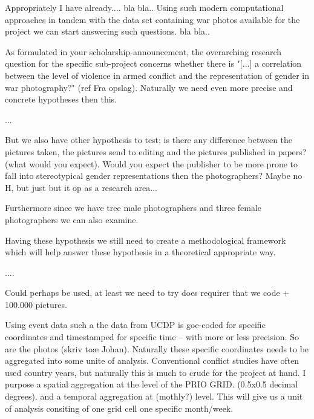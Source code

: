 \documentclass[a4paper]{article}
\begin{document}
Appropriately I have already.... bla bla.. Using such modern computational approaches in tandem with the data set containing war photos available for the project we can start answering such questions. bla bla.. \par

As formulated in your scholarship-announcement, the overarching research question for the specific sub-project concerns whether there is "[...] a correlation between the level of violence in armed conflict and the representation of gender in war photography?" (ref Fra opslag). Naturally we need even more precise and concrete hypotheses then this.\par %


... \par

But we also have other hypothesis to test; is there any difference between the pictures taken, the pictures send to editing and the pictures published in papers? (what would you expect). Would you expect the publisher to be more prone to fall into stereotypical gender representations then the photographers? Maybe no H, but just but it op as a research area...

Furthermore since we have tree male photographers and three female photographers we can also examine. 

Having these hypothesis we still need to create a methodological framework which will help answer these hypothesis in a theoretical appropriate way.

....

Could perhaps be used, at least we need to try does requirer that we code + 100.000 pictures.

Using event data such a the data from UCDP is goe-coded for specific coordinates and timestamped for specific time -- with more or less precision. So are the photos (skriv toæ Johan). Naturally these specific coordinates needs to be aggregated into some unite of analysis. Conventional conflict studies have often used country years, but naturally this is much to crude for the project at hand. I purpose a spatial aggregation at the level of the PRIO GRID. (0.5x0.5 decimal degrees). and a temporal aggregation at (mothly?) level. This will give us a unit of analysis consiting of one grid cell one specific month/week. 
\end{document}
